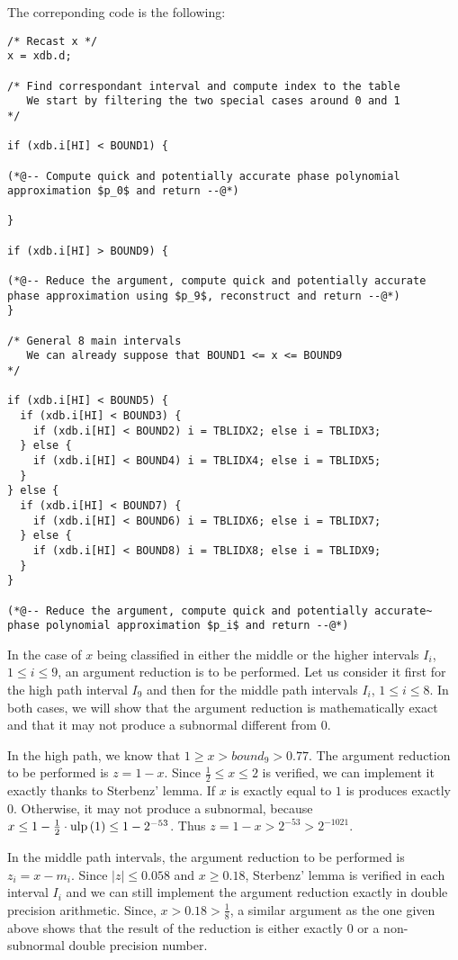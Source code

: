 The correponding code is the following:
\begin{lstlisting}[caption={Interval discrimination},firstnumber=1]
/* Recast x */
x = xdb.d;

/* Find correspondant interval and compute index to the table
   We start by filtering the two special cases around 0 and 1
*/

if (xdb.i[HI] < BOUND1) {

(*@-- Compute quick and potentially accurate phase polynomial approximation $p_0$ and return --@*)

}

if (xdb.i[HI] > BOUND9) {

(*@-- Reduce the argument, compute quick and potentially accurate
phase approximation using $p_9$, reconstruct and return --@*)
}

/* General 8 main intervals
   We can already suppose that BOUND1 <= x <= BOUND9
*/

if (xdb.i[HI] < BOUND5) {
  if (xdb.i[HI] < BOUND3) {
    if (xdb.i[HI] < BOUND2) i = TBLIDX2; else i = TBLIDX3;
  } else {
    if (xdb.i[HI] < BOUND4) i = TBLIDX4; else i = TBLIDX5;
  }
} else {
  if (xdb.i[HI] < BOUND7) {
    if (xdb.i[HI] < BOUND6) i = TBLIDX6; else i = TBLIDX7;
  } else {
    if (xdb.i[HI] < BOUND8) i = TBLIDX8; else i = TBLIDX9;
  }
}

(*@-- Reduce the argument, compute quick and potentially accurate~
phase polynomial approximation $p_i$ and return --@*)
\end{lstlisting}

In the case of $x$ being classified in either the middle or the higher
intervals $I_i$, $1 \leq i \leq 9$, an argument reduction is to be
performed. Let us consider it first for the high path interval $I_9$
and then for the middle path intervals $I_i$, $1 \leq i \leq 8$. In
both cases, we will show that the argument reduction is mathematically
exact and that it may not produce a subnormal different from $0$.

In the high path, we know that $1 \geq x > bound_9 > 0.77$. The
argument reduction to be performed is $z = 1 - x$. Since $\frac{1}{2}
\leq x \leq 2$ is verified, we can implement it exactly thanks to
Sterbenz' lemma. If $x$ is exactly equal to $1$ is produces exactly
$0$. Otherwise, it may not produce a subnormal, because $x \leq 1 -
\frac{1}{2} \cdot \mathrm{ulp}\left( 1 \right) \leq 1 - 2^{-53}$. Thus $z = 1
- x > 2^{-53} > 2^{-1021}$.

In the middle path intervals, the argument reduction to be performed
is $z_i = x - m_i$. Since $\left \vert z \right \vert \leq 0.058$ and
$x \geq 0.18$, Sterbenz' lemma is verified in each interval $I_i$ and
we can still implement the argument reduction exactly in double
precision arithmetic. Since, $x > 0.18 > \frac{1}{8}$, a similar
argument as the one given above shows that the result of the reduction
is either exactly $0$ or a non-subnormal double precision number.

